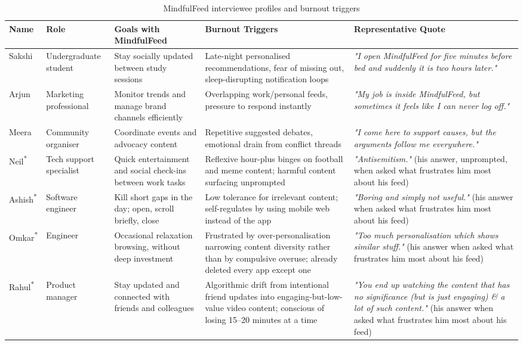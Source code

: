 \documentclass[11pt]{article}
\begin{document}
\begin{table}[H]
\centering
\caption{MindfulFeed interviewee profiles and burnout triggers}
\label{tab:profiles_mindfulfeed}
\small
\begin{tabular}{p{1.8cm}p{2.6cm}p{3.2cm}p{3.2cm}p{5.5cm}}
\hline
\textbf{Name} & \textbf{Role} & \textbf{Goals with MindfulFeed} & \textbf{Burnout Triggers} & \textbf{Representative Quote} \\
\hline
Sakshi & Undergraduate student & Stay socially updated between study sessions & Late-night personalised recommendations, fear of missing out, sleep-disrupting notification loops & \textit{"I open MindfulFeed for five minutes before bed and suddenly it is two hours later."} \\
Arjun & Marketing professional & Monitor trends and manage brand channels efficiently & Overlapping work/personal feeds, pressure to respond instantly & \textit{"My job is inside MindfulFeed, but sometimes it feels like I can never log off."} \\
Meera & Community organiser & Coordinate events and advocacy content & Repetitive suggested debates, emotional drain from conflict threads & \textit{"I come here to support causes, but the arguments follow me everywhere."} \\
Neil\textsuperscript{*} & Tech support specialist & Quick entertainment and social check-ins between work tasks & Reflexive hour-plus binges on football and meme content; harmful content surfacing unprompted & \textit{"Antisemitism."} (his answer, unprompted, when asked what frustrates him most about his feed) \\
Ashish\textsuperscript{*} & Software engineer & Kill short gaps in the day; open, scroll briefly, close & Low tolerance for irrelevant content; self-regulates by using mobile web instead of the app & \textit{"Boring and simply not useful."} (his answer when asked what frustrates him most about his feed) \\
Omkar\textsuperscript{*} & Engineer & Occasional relaxation browsing, without deep investment & Frustrated by over-personalisation narrowing content diversity rather than by compulsive overuse; already deleted every app except one & \textit{"Too much personalisation which shows similar stuff."} (his answer when asked what frustrates him most about his feed) \\
Rahul\textsuperscript{*} & Product manager & Stay updated and connected with friends and colleagues & Algorithmic drift from intentional friend updates into engaging-but-low-value video content; conscious of losing 15--20 minutes at a time & \textit{"You end up watching the content that has no significance (but is just engaging) \& a lot of such content."} (his answer when asked what frustrates him most about his feed) \\

\end{tabular}
\end{table}
\end{document}
